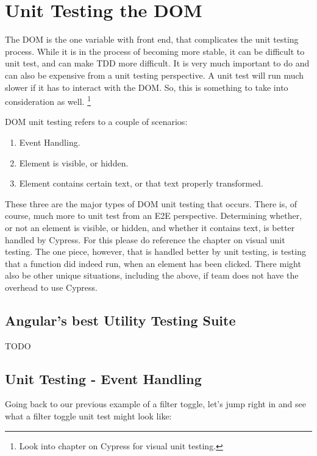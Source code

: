 \maketitle{}
\section{ Unit Testing the DOM}
The DOM is the one variable with front end, that complicates the unit testing
process. While it is in the process of becoming more stable, it can be difficult
to unit test, and can make TDD more difficult. It is very much important to do
and can also be expensive from a unit testing perspective. A unit test will
run much slower if it has to interact with the DOM. So, this is something to
take into consideration as well. \footnote{Look into chapter on Cypress for
visual unit testing.}

DOM unit testing refers to a couple of scenarios:
\begin{enumerate}
  \item Event Handling.
  \item Element is visible, or hidden.
  \item Element contains certain text, or that text properly transformed.
\end{enumerate}

These three are the major types of DOM unit testing that occurs. There is, of
course, much more to unit test from an E2E perspective. Determining whether, or
not an element is visible, or hidden, and whether it contains text, is better
handled by Cypress. For this please do reference the chapter on visual unit
testing. The one piece, however, that is handled better by unit testing, is
testing that a function did indeed run, when an element has been clicked. There
might also be other unique situations, including the above, if team does not
have the overhead to use Cypress. 

\subsection{ Angular's best Utility Testing Suite }

TODO

\subsection{ Unit Testing - Event Handling }
Going back to our previous example of a filter toggle, let's jump right in and
see what a filter toggle unit test might look like:

